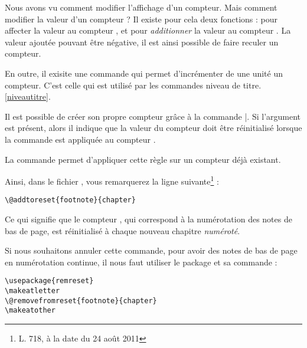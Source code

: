 Nous avons vu comment modifier l'affichage d'un compteur. Mais comment modifier la valeur d'un compteur ? Il existe pour cela deux fonctions :  pour affecter la valeur  au compteur , et  pour \emph{additionner} la valeur  au compteur . La valeur ajoutée pouvant être négative, il est ainsi possible de faire reculer un compteur.

En outre, il exisite une commande  qui permet d'incrémenter de une unité un compteur. C'est celle qui est utilisé par les commandes niveau de titre.\ref{niveautitre}.



Il est possible de créer son propre compteur grâce à la commande |. Si l'argument  est présent, alors il indique que la valeur du compteur  doit être réinitialisé lorsque la commande  est appliquée au compteur .

La commande    permet d'appliquer cette règle sur un compteur déjà existant.

Ainsi, dans le fichier , vous remarquerez la ligne suivante\footnote{L. 718, à la date du 24 août 2011}  :
\begin{verbatim}
\@addtoreset{footnote}{chapter}
\end{verbatim} 

Ce qui signifie que le compteur  , qui correspond à la numérotation des notes de bas de page, est réinitialisé à chaque nouveau chapitre \emph{numéroté}. 

Si nous souhaitons annuler cette commande, pour avoir des notes de bas de page en numérotation continue, il nous faut utiliser le package  et sa commande  :

\begin{verbatim}
\usepackage{remreset}
\makeatletter
\@removefromreset{footnote}{chapter}
\makeatother
\end{verbatim}
